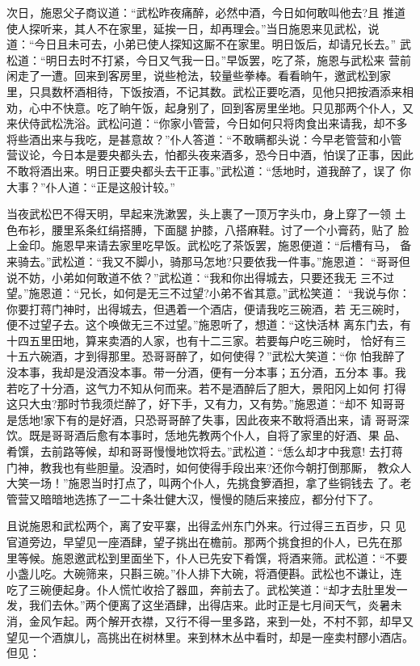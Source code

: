 次日，施恩父子商议道：“武松昨夜痛醉，必然中酒，今日如何敢叫他去?且
推道使人探听来，其人不在家里，延挨一日，却再理会。”当日施恩来见武松，说
道：“今日且未可去，小弟已使人探知这厮不在家里。明日饭后，却请兄长去。”
武松道：“明日去时不打紧，今日又气我一日。”早饭罢，吃了茶，施恩与武松来
营前闲走了一遭。回来到客房里，说些枪法，较量些拳棒。看看晌午，邀武松到家
里，只具数杯酒相待，下饭按酒，不记其数。武松正要吃酒，见他只把按酒添来相
劝，心中不快意。吃了晌午饭，起身别了，回到客房里坐地。只见那两个仆人，又
来伏侍武松洗浴。武松问道：“你家小管营，今日如何只将肉食出来请我，却不多
将些酒出来与我吃，是甚意故？”仆人答道：“不敢瞒都头说：今早老管营和小管
营议论，今日本是要央都头去，怕都头夜来酒多，恐今日中酒，怕误了正事，因此
不敢将酒出来。明日正要央都头去干正事。”武松道：“恁地时，道我醉了，误了
你大事？”仆人道：“正是这般计较。”

当夜武松巴不得天明，早起来洗漱罢，头上裹了一顶万字头巾，身上穿了一领
土色布衫，腰里系条红绢搭膊，下面腿护膝，八搭麻鞋。讨了一个小膏药，贴了
脸上金印。施恩早来请去家里吃早饭。武松吃了茶饭罢，施恩便道：“后槽有马，
备来骑去。”武松道：“我又不脚小，骑那马怎地?只要依我一件事。”施恩道：
“哥哥但说不妨，小弟如何敢道不依？”武松道：“我和你出得城去，只要还我无
三不过望。”施恩道：“兄长，如何是无三不过望?小弟不省其意。”武松笑道：
“我说与你：你要打蒋门神时，出得城去，但遇着一个酒店，便请我吃三碗酒，若
无三碗时，便不过望子去。这个唤做无三不过望。”施恩听了，想道：“这快活林
离东门去，有十四五里田地，算来卖酒的人家，也有十二三家。若要每户吃三碗时，
恰好有三十五六碗酒，才到得那里。恐哥哥醉了，如何使得？”武松大笑道：“你
怕我醉了没本事，我却是没酒没本事。带一分酒，便有一分本事；五分酒，五分本
事。我若吃了十分酒，这气力不知从何而来。若不是酒醉后了胆大，景阳冈上如何
打得这只大虫?那时节我须烂醉了，好下手，又有力，又有势。”施恩道：“却不
知哥哥是恁地!家下有的是好酒，只恐哥哥醉了失事，因此夜来不敢将酒出来，请
哥哥深饮。既是哥哥酒后愈有本事时，恁地先教两个仆人，自将了家里的好酒、果
品、肴馔，去前路等候，却和哥哥慢慢地饮将去。”武松道：“恁么却才中我意!
去打蒋门神，教我也有些胆量。没酒时，如何使得手段出来?还你今朝打倒那厮，
教众人大笑一场！”施恩当时打点了，叫两个仆人，先挑食箩酒担，拿了些铜钱去
了。老管营又暗暗地选拣了一二十条壮健大汉，慢慢的随后来接应，都分付下了。

且说施恩和武松两个，离了安平寨，出得孟州东门外来。行过得三五百步，只
见官道旁边，早望见一座酒肆，望子挑出在檐前。那两个挑食担的仆人，已先在那
里等候。施恩邀武松到里面坐下，仆人已先安下肴馔，将酒来筛。武松道：“不要
小盏儿吃。大碗筛来，只斟三碗。”仆人排下大碗，将酒便斟。武松也不谦让，连
吃了三碗便起身。仆人慌忙收拾了器皿，奔前去了。武松笑道：“却才去肚里发一
发，我们去休。”两个便离了这坐酒肆，出得店来。此时正是七月间天气，炎暑未
消，金风乍起。两个解开衣襟，又行不得一里多路，来到一处，不村不郭，却早又
望见一个酒旗儿，高挑出在树林里。来到林木丛中看时，却是一座卖村醪小酒店。
但见：

